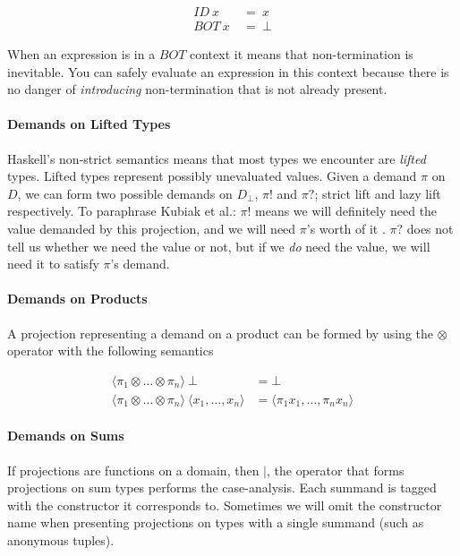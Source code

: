 \begin{align}
ID \ x \ &= \ x \\
BOT \ x \ &= \ \bot
\end{align}


When an expression is in a $BOT$ context it means that non-termination is
inevitable. You can safely evaluate an expression in this context because there
is no danger of \emph{introducing} non-termination that is not already present.

\paragraph{Demands on Lifted Types} Haskell's non-strict semantics means that
most types we encounter are \emph{lifted} types.  Lifted types represent
possibly unevaluated values. Given a demand $\pi$ on $D$, we can form two
possible demands on $D_{\bot}$, $\pi!$ and $\pi?$; strict lift and lazy lift
respectively. To paraphrase Kubiak et al.: $\pi!$ means we will definitely need
the value demanded by this projection, and we will need $\pi$'s worth of it
\citep{kubiak}. $\pi?$ does not tell us whether we need the value or not, but if
we \emph{do} need the value, we will need it to satisfy $\pi$'s demand.

\paragraph{Demands on Products} A projection representing a demand on a product
can be formed by using the $\otimes$ operator with the following semantics

\begin{align*}
\langle \pi_{1} \otimes \dots \otimes \pi_{n} \rangle \ \bot &= \bot \\
\langle \pi_{1} \otimes \dots \otimes \pi_{n} \rangle \ 
\langle x_{1}, \dots, x_{n} \rangle &= \langle \pi_{1} x_{1}, \dots, \pi_{n} x_{n} \rangle
\end{align*}

\paragraph{Demands on Sums} If projections are functions on a domain, then
\nolinebreak $|$, the operator that forms projections on sum types performs the
case-analysis. Each summand is tagged with the constructor it corresponds to.
Sometimes we will omit the constructor name when presenting projections on
types with a single summand (such as anonymous tuples).

